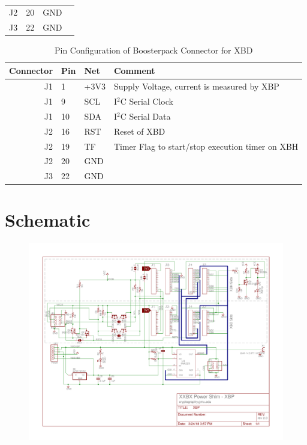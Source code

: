 \documentclass[twoside,11pt]{cergdoc}
\begin{document}
\begin{appendix}
\begin{table}[ht]
\begin{center}
\begin{tabular}{rlll}
       J2 & 20 & GND       & \\
       J3 & 22 & GND       & \\ \hline
    \end{tabular}
  \end{center}
\end{table}
\begin{table}[ht]
  \begin{center}
    \caption{Pin Configuration of Boosterpack Connector for XBD}
    \begin{tabular}{rlll}
      Connector & Pin  & Net         & Comment  \\ \hline
       J1 & 1  & +3V3      & Supply Voltage, current is measured by XBP \\
       J1 & 9  & SCL       & I$^2$C Serial Clock  \\
       J1 & 10 & SDA       & I$^2$C Serial Data \\
       J2 & 16 & RST       & Reset of XBD \\ 
       J2 & 19 & TF        & Timer Flag to start/stop execution timer on XBH \\
       J2 & 20 & GND       & \\
       J3 & 22 & GND       & \\ \hline
    \end{tabular}
  \end{center}
\end{table}

\chapter{Schematic}\label{sec:schematic}

\begin{figure}[ht]
    \vspace{-1.6cm}
    \hspace{-1.2cm}\includegraphics[scale=0.88, angle=90]{figures/XBP-schematic}
\end{figure}


\end{appendix}
\end{document}
